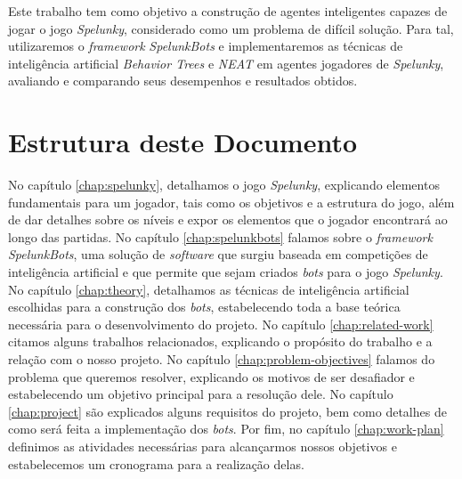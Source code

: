 Este trabalho tem como objetivo a construção de agentes inteligentes capazes de
jogar o jogo \textit{Spelunky}, considerado como um problema de difícil solução.
Para tal, utilizaremos o \textit{framework} \textit{SpelunkBots} e
implementaremos as técnicas de inteligência artificial \textit{Behavior Trees} e
\textit{NEAT} em agentes jogadores de \textit{Spelunky}, avaliando e comparando
seus desempenhos e resultados obtidos.


\section{\label{section:document-structure}Estrutura deste Documento}
No capítulo \ref{chap:spelunky}, detalhamos o jogo \textit{Spelunky},
explicando elementos fundamentais para um jogador, tais como os objetivos e a
estrutura do jogo, além de dar detalhes sobre os níveis e expor os elementos
que o jogador encontrará ao longo das partidas.
No capítulo \ref{chap:spelunkbots} falamos sobre o \textit{framework}
\textit{SpelunkBots}, uma solução de \textit{software} que surgiu baseada em
competições de inteligência artificial e que permite que sejam criados
\textit{bots} para o jogo \textit{Spelunky}.
No capítulo \ref{chap:theory}, detalhamos as técnicas de inteligência
artificial escolhidas para a construção dos \textit{bots}, estabelecendo toda a
base teórica necessária para o desenvolvimento do projeto.
No capítulo \ref{chap:related-work} citamos alguns trabalhos relacionados,
explicando o propósito do trabalho e a relação com o nosso projeto.
No capítulo \ref{chap:problem-objectives} falamos do problema que queremos
resolver, explicando os motivos de ser desafiador e estabelecendo um objetivo
principal para a resolução dele.
No capítulo \ref{chap:project} são explicados alguns requisitos do projeto,
bem como detalhes de como será feita a implementação dos \textit{bots}.
Por fim, no capítulo \ref{chap:work-plan} definimos as atividades
necessárias para alcançarmos nossos objetivos e estabelecemos um cronograma
para a realização delas.
